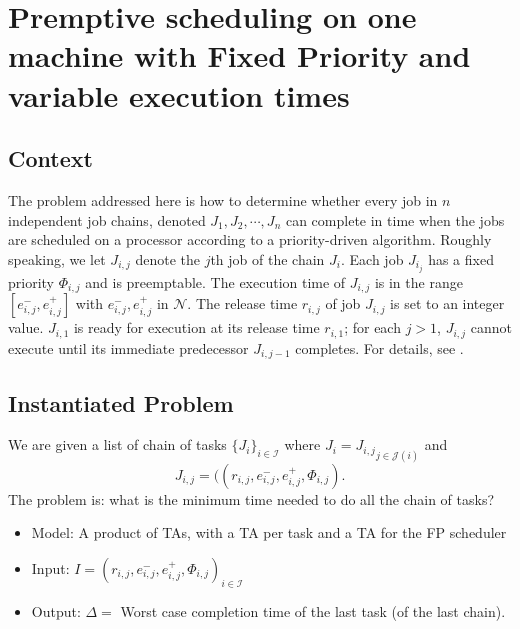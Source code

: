 \documentclass{article}
\begin{document}
\section{Premptive scheduling on one machine with Fixed Priority and variable execution times \cite{sgl97}}
\subsection{Context}
The problem addressed here is how to determine whether every job in $n$ independent job chains, denoted $J_1, J_2, \cdots, J_n$ can complete in time when the jobs are scheduled on a processor according to a 
priority-driven algorithm. Roughly speaking, we let $J_{i,j}$ denote the $j$th job of the chain $J_i$. Each job $J_{i_j}$ has a fixed priority $\Phi_{i,j}$ and is preemptable. The execution time of $J_{i,j}$ is
in the range $[e^{-}_{i,j},e^{+}_{i,j}]$ with $e^{-}_{i,j},e^{+}_{i,j}$ in $\mathcal{N}$. The release time $r_{i,j}$ of job $J_{i,j}$ is set to an integer value. $J_{i,1}$ is ready for execution at its release time $r_{i,1}$; for each $j > 1$, $J_{i,j}$ cannot
execute until its immediate predecessor $J_{i,j-1}$ completes. For details, see \cite{sgl97}. 
% 
% 
\subsection{Instantiated Problem}
We are given a list of chain of tasks $\{J_i\}_{i \in \mathcal{I}}$ where $J_i = {J_{i,j}}_{j \in \mathcal{J}(i)}$ and $$J_{i,j} = ((r_{i,j},e^{-}_{i,j},e^{+}_{i,j},\Phi_{i,j}).$$
The problem is: what is the minimum time needed to do all the chain of tasks?
\begin{itemize}
 \item Model: A product of TAs, with a TA per task and a TA for the FP scheduler
 \item Input: $I = (r_{i,j},e^{-}_{i,j},e^{+}_{i,j},\Phi_{i,j})_{i\in \mathcal{I}}$
 \item Output: $\Delta =$ Worst case completion time of the last task (of the last chain).
\end{itemize}
\end{document}
